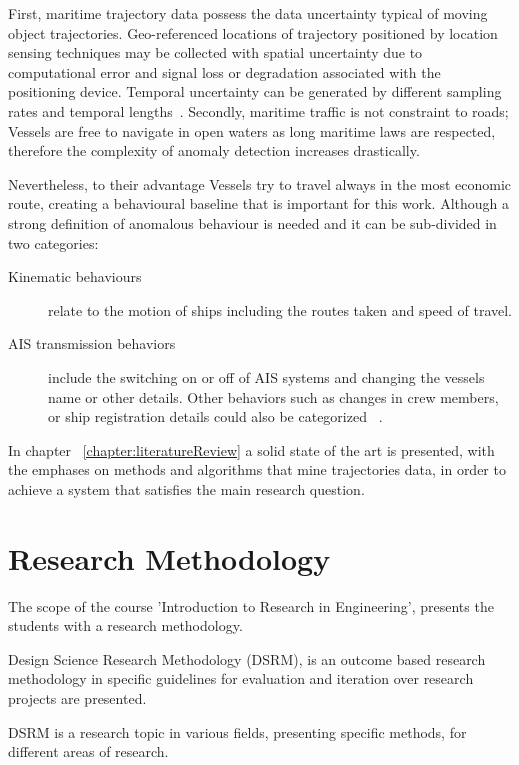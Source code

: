 First, maritime trajectory data possess the data uncertainty typical of moving object trajectories.
Geo-referenced locations of trajectory positioned by location sensing techniques may be collected with spatial uncertainty due to computational error and signal loss or degradation associated with the positioning device. Temporal uncertainty can be generated by different sampling rates and temporal lengths~\cite{Lee}. Secondly, maritime traffic is not constraint to roads; Vessels are free to navigate in open waters 
as long maritime laws are respected, therefore the complexity of anomaly detection increases drastically.

Nevertheless, to their advantage Vessels try to travel always in the most economic route, creating a behavioural baseline that is important for this work. Although a strong definition of anomalous behaviour is needed and it can be sub-divided in two categories:

\begin{description}
\item[Kinematic behaviours] relate to the motion of ships including the routes taken and speed of travel.
\item [AIS transmission behaviors] include the switching on or off of AIS systems and changing the vessels name or other details. Other behaviors such as changes in crew members, or ship registration details could also be categorized ~\cite{Lane2010}.
\end{description}

In chapter ~\ref{chapter:literatureReview} a solid state of the art is presented, with the emphases on methods and algorithms that mine trajectories data, in order to achieve a system that satisfies the main research question.


\section{Research Methodology}
The scope of the course 'Introduction to Research in Engineering', presents the students with a research methodology.

Design Science Research Methodology (DSRM), is an outcome based research methodology in specific guidelines for evaluation and iteration over research projects are presented.

DSRM is a research topic in various fields, presenting specific methods, for different areas of research. 

